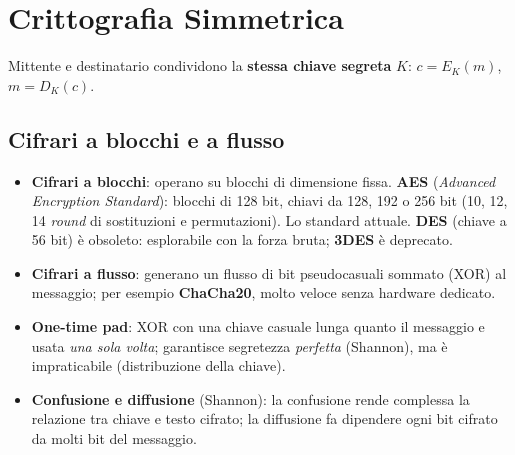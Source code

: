 \section{Crittografia Simmetrica}
Mittente e destinatario condividono la \textbf{stessa chiave segreta} $K$: $c = E_K(m)$, $m = D_K(c)$.

\subsection{Cifrari a blocchi e a flusso}
\begin{itemize}
    \item \textbf{Cifrari a blocchi}: operano su blocchi di dimensione fissa. \textbf{AES} (\emph{Advanced Encryption Standard}): blocchi di 128 bit, chiavi da 128, 192 o 256 bit (10, 12, 14 \emph{round} di sostituzioni e permutazioni). Lo standard attuale. \textbf{DES} (chiave a 56 bit) è obsoleto: esplorabile con la forza bruta; \textbf{3DES} è deprecato.
    \item \textbf{Cifrari a flusso}: generano un flusso di bit pseudocasuali sommato (XOR) al messaggio; per esempio \textbf{ChaCha20}, molto veloce senza hardware dedicato.
    \item \textbf{One-time pad}: XOR con una chiave casuale lunga quanto il messaggio e usata \emph{una sola volta}; garantisce segretezza \emph{perfetta} (Shannon), ma è impraticabile (distribuzione della chiave).
    \item \textbf{Confusione e diffusione} (Shannon): la confusione rende complessa la relazione tra chiave e testo cifrato; la diffusione fa dipendere ogni bit cifrato da molti bit del messaggio.
\end{itemize}

